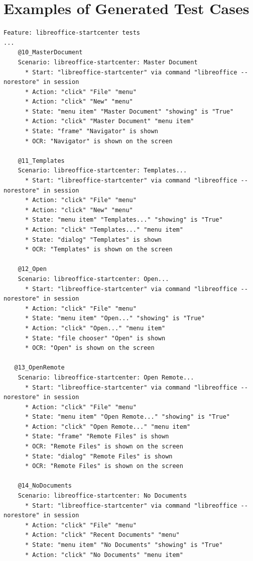 \chapter{Examples of Generated Test Cases}\label{tests_example}
\begin{lstlisting}[language=Gherkin, caption={Test cases generated for LibreOffice StartCenter}]
Feature: libreoffice-startcenter tests
...    
    @10_MasterDocument
    Scenario: libreoffice-startcenter: Master Document
      * Start: "libreoffice-startcenter" via command "libreoffice --norestore" in session
      * Action: "click" "File" "menu"
      * Action: "click" "New" "menu"
      * State: "menu item" "Master Document" "showing" is "True"
      * Action: "click" "Master Document" "menu item"
      * State: "frame" "Navigator" is shown
      * OCR: "Navigator" is shown on the screen
  
    @11_Templates
    Scenario: libreoffice-startcenter: Templates...
      * Start: "libreoffice-startcenter" via command "libreoffice --norestore" in session
      * Action: "click" "File" "menu"
      * Action: "click" "New" "menu"
      * State: "menu item" "Templates..." "showing" is "True"
      * Action: "click" "Templates..." "menu item"
      * State: "dialog" "Templates" is shown
      * OCR: "Templates" is shown on the screen

    @12_Open
    Scenario: libreoffice-startcenter: Open...
      * Start: "libreoffice-startcenter" via command "libreoffice --norestore" in session
      * Action: "click" "File" "menu"
      * State: "menu item" "Open..." "showing" is "True"
      * Action: "click" "Open..." "menu item"
      * State: "file chooser" "Open" is shown
      * OCR: "Open" is shown on the screen
      
   @13_OpenRemote
    Scenario: libreoffice-startcenter: Open Remote...
      * Start: "libreoffice-startcenter" via command "libreoffice --norestore" in session
      * Action: "click" "File" "menu"
      * State: "menu item" "Open Remote..." "showing" is "True"
      * Action: "click" "Open Remote..." "menu item"
      * State: "frame" "Remote Files" is shown
      * OCR: "Remote Files" is shown on the screen
      * State: "dialog" "Remote Files" is shown
      * OCR: "Remote Files" is shown on the screen
  
    @14_NoDocuments
    Scenario: libreoffice-startcenter: No Documents
      * Start: "libreoffice-startcenter" via command "libreoffice --norestore" in session
      * Action: "click" "File" "menu"
      * Action: "click" "Recent Documents" "menu"
      * State: "menu item" "No Documents" "showing" is "True"
      * Action: "click" "No Documents" "menu item"
  

\end{lstlisting}
